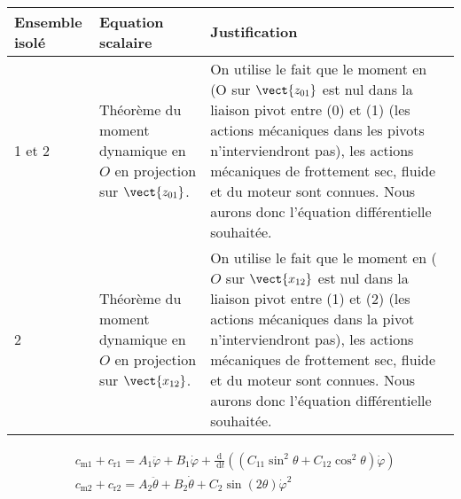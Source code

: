 \ifprof
\begin{corrige} ~\\
\begin{center}
\begin{tabular}{lp{5cm}p{7cm}}
\hline
\textbf{Ensemble isolé} & \textbf{Equation scalaire} & \textbf{Justification} \\
\hline
 1 et 2 & 
Théorème du moment dynamique en $O$ en projection sur $\vect{z_{01}}$. 
& On utilise le fait que le moment en (O sur $\vect{z_{01}}$ est nul dans la liaison pivot entre (0) et (1) (les actions mécaniques dans les pivots n’interviendront pas), les actions mécaniques de frottement sec, fluide et du moteur sont connues. Nous aurons donc l’équation différentielle souhaitée. \\
 2 &	
Théorème du moment dynamique en $O$ en projection sur $\vect{x_{12}}$. 
&On utilise le fait que le moment en ($O$ sur $\vect{x_{12}}$ est nul dans la liaison pivot entre (1) et (2) (les actions mécaniques dans la pivot n’interviendront pas), les actions mécaniques de frottement sec, fluide et du moteur sont connues. Nous aurons donc l’équation différentielle souhaitée. \\
\hline
\end{tabular}
\end{center}
\end{corrige}
\else
\fi




$$
\begin{aligned}
& c_{\mathrm{m} 1}+c_{\mathrm{r} 1}=A_{1} \ddot{\varphi}+B_{1} \dot{\varphi}+\frac{\mathrm{d}}{\mathrm{~d} t}\left(\left(C_{11} \sin ^{2} \theta+C_{12} \cos ^{2} \theta\right) \dot{\varphi}\right) \\
& c_{\mathrm{m} 2}+c_{\mathrm{r} 2}=A_{2} \ddot{\theta}+B_{2} \dot{\theta}+C_{2} \sin (2 \theta) \dot{\varphi}^{2}
\end{aligned}
$$

